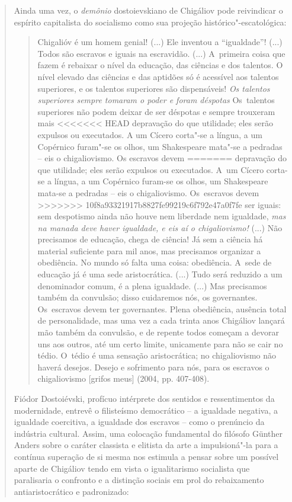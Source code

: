 {\begin{quote}
Ainda uma vez, o \emph{demônio} dostoievskiano de Chigáliov pode
reivindicar o espírito capitalista do socialismo como sua projeção
histórico"-escatológica:

\begin{quote}
Chigalióv é um homem genial! (...) Ele inventou a ``igualdade''! (...)
Todos são escravos e iguais na escravidão. (...) A~primeira coisa que
fazem é rebaixar o nível da educação, das ciências e dos talentos. O
nível elevado das ciências e das aptidões só é acessível aos talentos
superiores, e os talentos superiores são dispensáveis! \emph{Os talentos
superiores sempre tomaram o poder e foram déspotas} Os~talentos
superiores não podem deixar de ser déspotas e sempre trouxeram mais
<<<<<<< HEAD
depravação do que utilidade; eles serão expulsos ou executados. A um
Cícero corta"-se a língua, a um Copérnico furam"-se os olhos, um
Shakespeare mata"-se a pedradas -- eis o chigaliovismo. Os escravos devem
=======
depravação do que utilidade; eles serão expulsos ou executados. A~um
Cícero corta-se a língua, a um Copérnico furam-se os olhos, um
Shakespeare mata-se a pedradas -- eis o chigaliovismo. Os~escravos devem
>>>>>>> 10f8a93321917b8827fe99219c6f792e47a0f7fe
ser iguais: sem despotismo ainda não houve nem liberdade nem igualdade,
\emph{mas na manada deve haver igualdade, e eis aí o chigaliovismo!}
(...) Não precisamos de educação, chega de ciência! Já sem a ciência há
material suficiente para mil anos, mas precisamos organizar a
obediência. No mundo só falta uma coisa: obediência. A~sede de educação
já é uma sede aristocrática. (...) Tudo será reduzido a um denominador
comum, é a plena igualdade. (...) Mas precisamos também da convulsão;
disso cuidaremos nós, os governantes. Os~escravos devem ter governantes.
Plena obediência, ausência total de personalidade, mas uma vez a cada
trinta anos Chigáliov lançará mão também da convulsão, e de repente
todos começam a devorar uns aos outros, até um certo limite, unicamente
para não se cair no tédio. O~tédio é uma sensação aristocrática; no
chigaliovismo não haverá desejos. Desejo e sofrimento para nós, para os
escravos o chigaliovismo {[}grifos meus{]} (2004, pp. 407-408).
\end{quote}

Fiódor Dostoiévski, profícuo intérprete dos sentidos e ressentimentos da
modernidade, entrevê o filisteísmo democrático -- a igualdade negativa,
a igualdade coercitiva, a igualdade dos escravos -- como o prenúncio da
indústria cultural. Assim, uma colocação fundamental do filósofo Günther
Anders sobre o caráter classista e elitista da arte a impulsioná"-la para
a contínua superação de si mesma nos estimula a pensar sobre um possível
aparte de Chigáliov tendo em vista o igualitarismo socialista que
paralisaria o confronto e a distinção sociais em prol do rebaixamento
antiaristocrático e padronizado:


\end{quote}}
